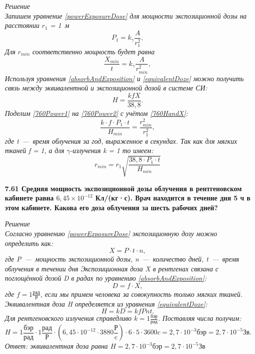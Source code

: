 \documentclass[a4paper, fontsize=14pt]{extreport}
\begin{document}
{\textit{Решение \\
%
Запишем уравнение \ref{powerExposureDose} для мощности экспозиционной дозы на расстоянии $r_1$ = 1~м
\begin{equation} \label{760Power1}
  P_1 = k_\gamma \frac{A}{r_1^2},
\end{equation}
Для $r_{min}$ соответственно мощность будет равна
\begin{equation} \label{760Power2}
  \frac{X_{min}}{t} = k_\gamma \frac{A}{r_{min}^2},
\end{equation}
Используя уравнения \ref{absorbAndExposition} и  \ref{equivalentDoze} можно получить связь между эквивалентной и экспозиционной дозой в системе СИ:
\begin{equation} \label{760HandX}
  H = \frac{kfX}{38,8}.
\end{equation}
Поделим \ref{760Power1} на \ref{760Power2} с учётом \ref{760HandX}:
\begin{equation}
  \frac{k \cdot f \cdot P_1\cdot t}{H_{min}} = \frac{r_{min}^2}{r_1^2},
\end{equation}
где t~---~время облучения за год, выраженное в секундах. Так как для мягких тканей f = 1, а для $\gamma$-излучения k = 1 то имеем:
\begin{equation}
  r_{min} = r_1 \sqrt{\frac{38,8 \cdot P_1 \cdot t}{H_{min}}}
\end{equation}
}

\textbf{7.61 Средняя мощность экспозиционной дозы облучения в рентгеновском кабинете равна $6,45 \times 10^{-12}$ Кл/(кг·с). Врач находится в течение дня 5 ч в этом кабинете. Какова его доза облучения за шесть рабочих дней?}

\textit{Решение \\
%
Согласно уравнению \ref{powerExposureDose} экспозиционную дозу можно определить как:
\begin{equation}
  X = P\cdot t \cdot n,
\end{equation}
где P~---~мощность экспозиционной дозы, n~---~количество дней, t~---~время облучения в течении дня
Экспозиционная доза X в рентгенах связана с поглощённой дозой D в радах по уравнению \ref{absorbAndExposition}: 
\begin{equation}
  D = f \cdot X,
\end{equation}  
где $f = 1 \frac{\text{рад}}{\text{Р}}$, если мы примем человека за совокупность только мягких  тканей. Эквивалентная доза H определяется из уравнения \ref{equivalentDoze}:
\begin{equation}
  H = kD = k f P n t.
\end{equation}   
Для рентгеновского излучения справедливо $k = 1 \frac{\text{бэр}}{\text{рад}}$.
Поставляя числа получим: 
\begin{equation}
  H =  1 \frac{\text{бэр}}{\text{рад}} \cdot 1 \frac{\text{рад}}{\text{Р}} \cdot \left ( 6,45 \cdot 10^{-12} \cdot 3880\frac{\text{Р}}{\text{c}} \right ) \cdot 6 \cdot 5 \cdot 3600c = 2,7 \cdot 10^{-3} \text{бэр} =  2,7 \cdot 10^{-5} \text{Зв}.
\end{equation}
Ответ: эквивалентная доза равна $H = 2,7 \cdot 10^{-3} \text{бэр} =  2,7 \cdot 10^{-5} \text{Зв}$}

}
\end{document}
